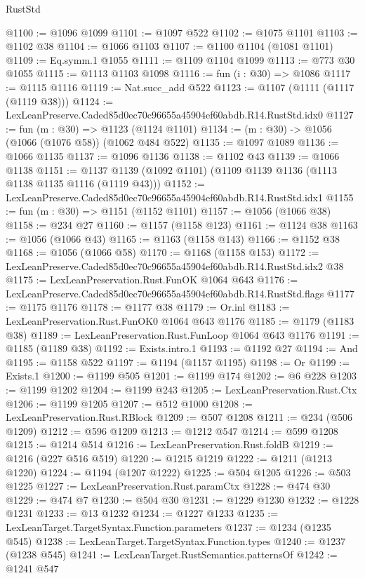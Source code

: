 \begin{lexlean}{RustStd}
\begin{coremodule}
@1100 := @1096 @1099
@1101 := @1097 @522
@1102 := @1075 @1101
@1103 := @1102 @38
@1104 := @1066 @1103
@1107 := @1100 @1104 (@1081 @1101)
@1109 := Eq.symm.{1} @1055
@1111 := @1109 @1104 @1099
@1113 := @773 @30 @1055
@1115 := @1113 @1103 @1098
@1116 := fun (i : @30) => @1086
@1117 := @1115 @1116
@1119 := Nat.succ_add @522
@1123 := @1107 (@1111 (@1117 (@1119 @38)))
@1124 := LexLeanPreserve.Caded85d0ec70c96655a45904ef60abdb.R14.RustStd.idx0
@1127 := fun (m : @30) => @1123 (@1124 @1101)
@1134 := (m : @30) -> @1056 (@1066 (@1076 @58)) (@1062 @484 @522)
@1135 := @1097 @1089
@1136 := @1066 @1135
@1137 := @1096 @1136
@1138 := @1102 @43
@1139 := @1066 @1138
@1151 := @1137 @1139 (@1092 @1101) (@1109 @1139 @1136 (@1113 @1138 @1135 @1116 (@1119 @43)))
@1152 := LexLeanPreserve.Caded85d0ec70c96655a45904ef60abdb.R14.RustStd.idx1
@1155 := fun (m : @30) => @1151 (@1152 @1101)
@1157 := @1056 (@1066 @38)
@1158 := @234 @27
@1160 := @1157 (@1158 @123)
@1161 := @1124 @38
@1163 := @1056 (@1066 @43)
@1165 := @1163 (@1158 @143)
@1166 := @1152 @38
@1168 := @1056 (@1066 @58)
@1170 := @1168 (@1158 @153)
@1172 := LexLeanPreserve.Caded85d0ec70c96655a45904ef60abdb.R14.RustStd.idx2 @38
@1175 := LexLeanPreservation.Rust.FunOK @1064 @643
@1176 := LexLeanPreserve.Caded85d0ec70c96655a45904ef60abdb.R14.RustStd.flags
@1177 := @1175 @1176
@1178 := @1177 @38
@1179 := Or.inl
@1183 := LexLeanPreservation.Rust.FunOK0 @1064 @643 @1176
@1185 := @1179 (@1183 @38)
@1189 := LexLeanPreservation.Rust.FunLoop @1064 @643 @1176
@1191 := @1185 (@1189 @38)
@1192 := Exists.intro.{1}
@1193 := @1192 @27
@1194 := And
@1195 := @1158 @522
@1197 := @1194 (@1157 @1195)
@1198 := Or
@1199 := Exists.{1}
@1200 := @1199 @505
@1201 := @1199 @174
@1202 := @6 @228
@1203 := @1199 @1202
@1204 := @1199 @243
@1205 := LexLeanPreservation.Rust.Ctx
@1206 := @1199 @1205
@1207 := @512 @1000
@1208 := LexLeanPreservation.Rust.RBlock
@1209 := @507 @1208
@1211 := @234 (@506 @1209)
@1212 := @596 @1209
@1213 := @1212 @547
@1214 := @599 @1208
@1215 := @1214 @514
@1216 := LexLeanPreservation.Rust.foldB
@1219 := @1216 (@227 @516 @519)
@1220 := @1215 @1219
@1222 := @1211 (@1213 @1220)
@1224 := @1194 (@1207 @1222)
@1225 := @504 @1205
@1226 := @503 @1225
@1227 := LexLeanPreservation.Rust.paramCtx
@1228 := @474 @30
@1229 := @474 @7
@1230 := @504 @30
@1231 := @1229 @1230
@1232 := @1228 @1231
@1233 := @13 @1232
@1234 := @1227 @1233
@1235 := LexLeanTarget.TargetSyntax.Function.parameters
@1237 := @1234 (@1235 @545)
@1238 := LexLeanTarget.TargetSyntax.Function.types
@1240 := @1237 (@1238 @545)
@1241 := LexLeanTarget.RustSemantics.patternsOf
@1242 := @1241 @547

\end{coremodule}
\end{lexlean}
